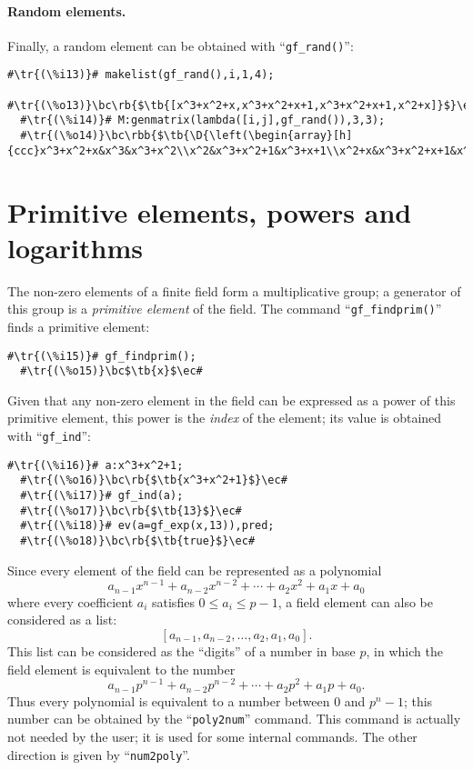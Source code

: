 \documentclass[a4paper,11pt,leqno,fleqn]{artikel3}
\newcommand{\D}{\displaystyle}
\newcommand{\bc}{\begin{center}}
\newcommand{\ec}{\end{center}}
\newcommand{\tr}[1]{\textcolor{red}{#1}}
\newcommand{\tb}[1]{\textcolor{blue}{#1}}
\newcommand{\rb}[1]{\raisebox{2mm}[0mm][1mm]{#1}}
\newcommand{\rbb}[1]{\raisebox{-4mm}[0mm][9mm]{#1}}
\begin{document}
\paragraph{Random elements.}

Finally, a random element can be obtained with ``\verb!gf_rand()!'':

\begin{lstlisting}[escapechar=\#]
  #\tr{(\%i13)}# makelist(gf_rand(),i,1,4);
  #\tr{(\%o13)}\bc\rb{$\tb{[x^3+x^2+x,x^3+x^2+x+1,x^3+x^2+x+1,x^2+x]}$}\ec#
  #\tr{(\%i14)}# M:genmatrix(lambda([i,j],gf_rand()),3,3);
  #\tr{(\%o14)}\bc\rbb{$\tb{\D{\left(\begin{array}[h]{ccc}x^3+x^2+x&x^3&x^3+x^2\\x^2&x^3+x^2+1&x^3+x+1\\x^2+x&x^3+x^2+x+1&x^2\end{array}\right)}}$}\ec#
\end{lstlisting}

\section*{Primitive elements, powers and logarithms}

The non-zero elements of a finite field form a multiplicative group; a
generator of this group is a \emph{primitive element} of the field.  The
command ``\verb!gf_findprim()!'' finds a primitive element:

\begin{lstlisting}[escapechar=\#]
  #\tr{(\%i15)}# gf_findprim();
  #\tr{(\%o15)}\bc$\tb{x}$\ec#
\end{lstlisting}

Given that any non-zero element in the field can be expressed as a power of
this primitive element, this power is the \emph{index} of the element; its
value is obtained with ``\verb!gf_ind!'':

\begin{lstlisting}[escapechar=\#]
  #\tr{(\%i16)}# a:x^3+x^2+1;
  #\tr{(\%o16)}\bc\rb{$\tb{x^3+x^2+1}$}\ec#
  #\tr{(\%i17)}# gf_ind(a);
  #\tr{(\%o17)}\bc\rb{$\tb{13}$}\ec#
  #\tr{(\%i18)}# ev(a=gf_exp(x,13)),pred;
  #\tr{(\%o18)}\bc\rb{$\tb{true}$}\ec#
\end{lstlisting}

Since every element of the field can be represented as a polynomial
\[
a_{n-1}x^{n-1}+a_{n-2}x^{n-2}+\cdots+a_2x^2+a_1x+a_0
\]
where every coefficient $a_i$ satisfies $0\le a_i\le p-1$, a field element can
also be considered as a list:
\[
[a_{n-1},a_{n-2},\ldots,a_2,a_1,a_0].
\]
This list can be considered as the ``digits'' of a number in base $p$, in
which the field element is equivalent to the number
\[
a_{n-1}p^{n-1}+a_{n-2}p^{n-2}+\cdots+a_2p^2+a_1p+a_0.
\]
Thus every polynomial is equivalent to a number between 0 and $p^n-1$; this
number can be obtained by the ``\texttt{poly2num}'' command.  This command is
actually not needed by the user; it is used for some internal commands.  The
other direction is given by ``\texttt{num2poly}''.
\end{document}
